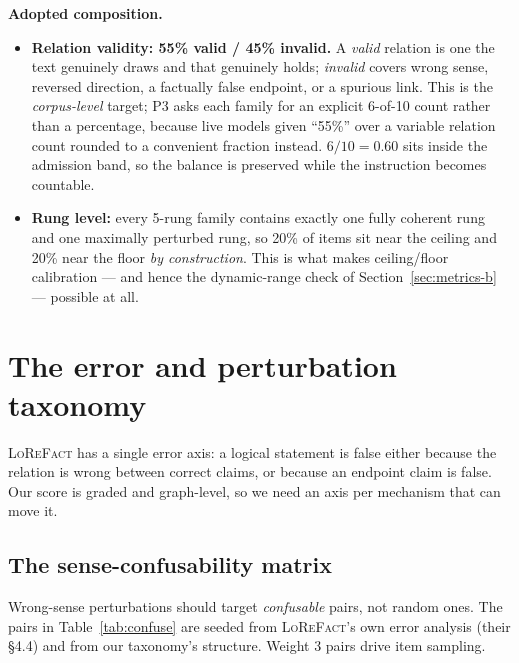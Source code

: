 \documentclass[11pt]{article}
\begin{document}
\noindent\textbf{Adopted composition.}
\begin{itemize}[leftmargin=*,nosep]
  \item \textbf{Relation validity: 55\% valid / 45\% invalid.} A \emph{valid} relation is one
        the text genuinely draws and that genuinely holds; \emph{invalid} covers wrong sense,
        reversed direction, a factually false endpoint, or a spurious link. This is the
        \emph{corpus-level} target; P3 asks each family for an explicit 6-of-10 count rather
        than a percentage, because live models given ``55\%'' over a variable relation count
        rounded to a convenient fraction instead. $6/10=0.60$ sits inside the admission band,
        so the balance is preserved while the instruction becomes countable.
  \item \textbf{Rung level:} every 5-rung family contains exactly one fully coherent rung and
        one maximally perturbed rung, so 20\% of items sit near the ceiling and 20\% near the
        floor \emph{by construction}. This is what makes ceiling/floor calibration --- and
        hence the dynamic-range check of Section~\ref{sec:metrics-b} --- possible at all.
\end{itemize}

\section{The error and perturbation taxonomy}
\label{sec:errors}

\textsc{LoReFact} has a single error axis: a logical statement is false either because the
relation is wrong between correct claims, or because an endpoint claim is false. Our score is
graded and graph-level, so we need an axis per mechanism that can move it.

\subsection{The sense-confusability matrix}
\label{sec:confusability}

Wrong-sense perturbations should target \emph{confusable} pairs, not random ones. The pairs in
Table~\ref{tab:confuse} are seeded from \textsc{LoReFact}'s own error analysis (their \S4.4)
and from our taxonomy's structure. Weight 3 pairs drive item sampling.
\end{document}

